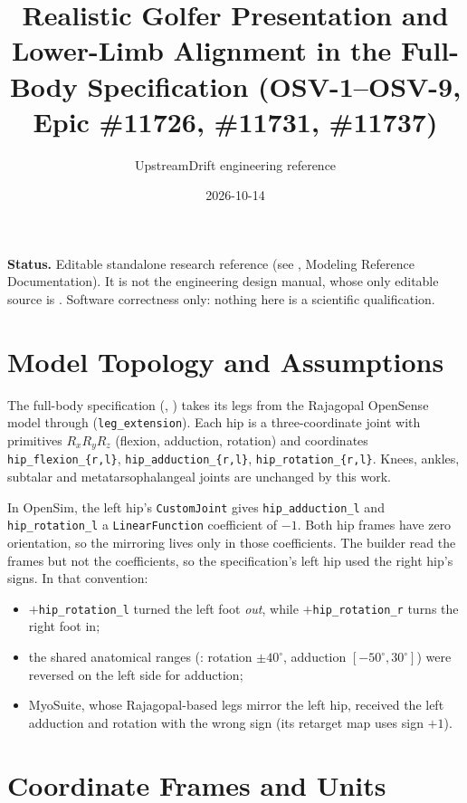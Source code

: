 \documentclass[11pt]{article}
\title{Realistic Golfer Presentation and Lower-Limb Alignment in the Full-Body Specification (OSV-1--OSV-9, Epic \#11726, \#11731, \#11737)}
\author{UpstreamDrift engineering reference}
\date{2026-10-14}
\begin{document}
\maketitle

\noindent\textbf{Status.} Editable standalone research reference (see
, Modeling Reference Documentation). It is not the
engineering design manual, whose only editable source is
. Software correctness only: nothing here is a
scientific qualification.

\section{Model Topology and Assumptions}

The full-body specification (,
) takes its legs from the Rajagopal
OpenSense model  through
(\texttt{leg\_extension}). Each hip is a three-coordinate joint with
primitives $R_x R_y R_z$ (flexion, adduction, rotation) and coordinates
\texttt{hip\_flexion\_\{r,l\}}, \texttt{hip\_adduction\_\{r,l\}},
\texttt{hip\_rotation\_\{r,l\}}. Knees, ankles, subtalar and
metatarsophalangeal joints are unchanged by this work.

In OpenSim, the left hip's \texttt{CustomJoint} gives
\texttt{hip\_adduction\_l} and \texttt{hip\_rotation\_l} a
\texttt{LinearFunction} coefficient of $-1$. Both hip frames have zero
orientation, so the mirroring lives only in those coefficients. The builder
read the frames but not the coefficients, so the specification's left hip
used the right hip's signs. In that convention:
\begin{itemize}
  \item $+$\texttt{hip\_rotation\_l} turned the left foot \emph{out}, while
    $+$\texttt{hip\_rotation\_r} turns the right foot in;
  \item the shared anatomical ranges (: rotation
    $\pm40^\circ$, adduction $[-50^\circ, 30^\circ]$) were reversed on the
    left side for adduction;
  \item MyoSuite, whose Rajagopal-based legs mirror the left hip, received
    the left adduction and rotation with the wrong sign (its retarget map uses
    sign $+1$).
\end{itemize}

\section{Coordinate Frames and Units}
\end{document}
